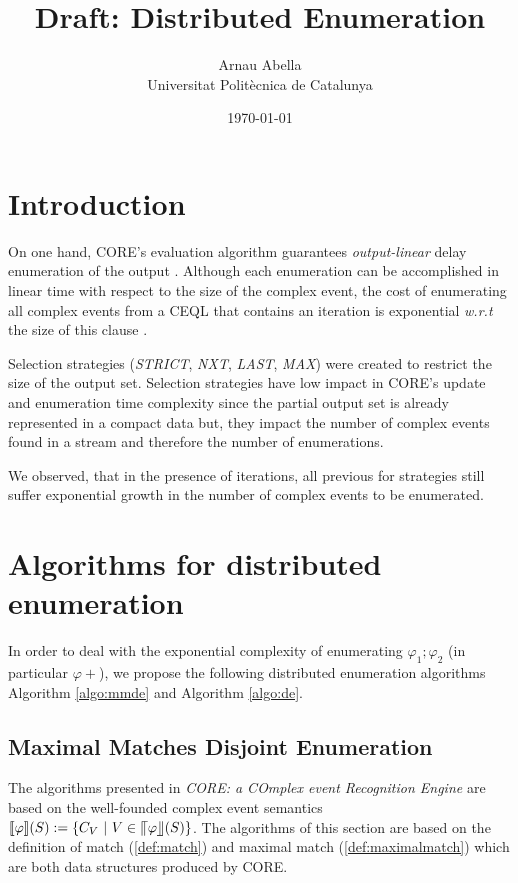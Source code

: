 \documentclass[12pt, a4paper]{article}
\title{%
  \vspace{-10ex}
  Draft: Distributed Enumeration
}
\author{%
  Arnau Abella \\
  \large{Universitat Polit\`ecnica de Catalunya}
}
\date{\today}
\begin{document}
\maketitle


\section{Introduction}
\label{sec:introduction}

On one hand, CORE's evaluation algorithm guarantees \textit{output-linear} delay enumeration of the output \cite{core}.
Although each enumeration can be accomplished in linear time with respect to the size of the complex event,
the cost of enumerating all complex events from a CEQL that contains an iteration is exponential \textit{w.r.t} the size of this clause \cite{grez_et_al:LIPIcs:2019:10307}.

Selection strategies (\textit{STRICT}, \textit{NXT}, \textit{LAST}, \textit{MAX}) were created to restrict the size of the output set.
Selection strategies have low impact in CORE's update and enumeration time complexity since the partial output set is already represented in a compact data but, they impact the number of complex events found in a stream and therefore the number of enumerations.

We observed, that in the presence of iterations, all previous for strategies still suffer exponential growth in the number of complex events to be enumerated.

\section{Algorithms for distributed enumeration}
\label{sec:algorithm}

In order to deal with the exponential complexity of enumerating $\varphi_{1} ; \varphi_{2}$ (in particular $\varphi+$), we propose the following distributed enumeration algorithms Algorithm \ref{algo:mmde} and Algorithm \ref{algo:de}.

\subsection{Maximal Matches Disjoint Enumeration}
\label{subsec:mmde}

The algorithms presented in \textit{CORE: a COmplex event Recognition Engine} are based on the well-founded complex event semantics $\llbracket \varphi \rrbracket (S) := \{ C_{V} \ | \ V \in \llceil \varphi \rrfloor (S) \}$. The algorithms of this section are based on the definition of match (\ref{def:match}) and maximal match (\ref{def:maximalmatch}) which are both data structures produced by CORE.
\end{document}
